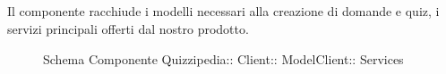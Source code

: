 \subsection{}
Il componente racchiude i modelli necessari alla creazione di domande e quiz, i servizi principali offerti dal nostro prodotto.
\begin{figure}[H]
\centering
\noindent{}
\caption[Schema Componente Quizzipedia::Client::ModelClient::Services]{Schema Componente Quizzipedia:: Client:: ModelClient:: Services}
\end{figure}
